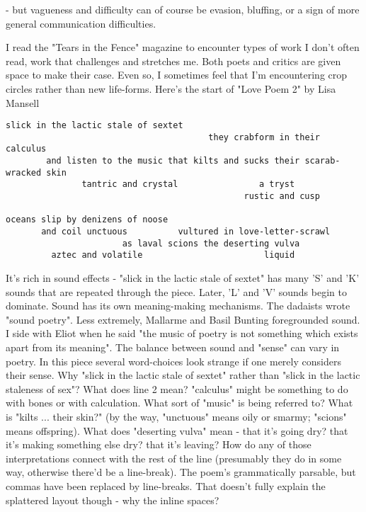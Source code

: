 \documentclass[11pt]{article}
\begin{document}
- but vagueness and difficulty can of course be evasion, bluffing, or a sign of more general communication difficulties.

I read the "Tears in the Fence" magazine to encounter types of work I don't often read, work that challenges and stretches me. Both poets and critics are given space to make their case. Even so, I sometimes feel that I'm encountering crop circles rather than new life-forms. Here's the start of "Love Poem 2" by Lisa Mansell
\begin{verbatim}
slick in the lactic stale of sextet
                                        they crabform in their calculus
        and listen to the music that kilts and sucks their scarab-wracked skin
               tantric and crystal                a tryst
                                               rustic and cusp

oceans slip by denizens of noose
       and coil unctuous          vultured in love-letter-scrawl
                       as laval scions the deserting vulva
         aztec and volatile                        liquid
\end{verbatim}


It's rich in sound effects - "slick in the lactic stale of sextet" has many 'S' and 'K' sounds that are repeated through the piece. Later, 'L' and 'V' sounds begin to dominate. Sound has its own meaning-making mechanisms. The dadaists wrote "sound poetry". Less extremely, Mallarme and Basil Bunting foregrounded sound. I side with Eliot when he said "the music of poetry is not something which exists apart from its meaning". The balance between sound and "sense" can vary in poetry. In this piece several word-choices look strange if one merely considers their sense. Why "slick in the lactic stale of sextet" rather than "slick in the lactic staleness of sex"? What does line 2 mean? "calculus" might be something to do with bones or with calculation. What sort of "music" is being referred to? What is "kilts ... their skin?" (by the way, "unctuous" means oily or smarmy; "scions" means offspring). What does "deserting vulva" mean - that it's going dry? that it's making something else dry? that it's leaving? How do any of those interpretations connect with the rest of the line (presumably they do in some way, otherwise there'd be a line-break). The poem's grammatically parsable, but commas have been replaced by line-breaks. That  doesn't fully explain the splattered layout though - why the inline spaces?
\end{document}
